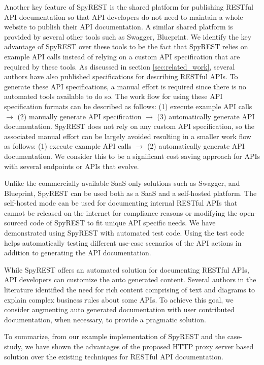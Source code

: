 \documentclass[conference]{IEEEtran}
\begin{document}
Another key feature of SpyREST is the shared platform for publishing RESTful API documentation so that API developers do not need to maintain a whole website to publish their API documentation. A similar shared platform is provided by several other tools such as Swagger, Blueprint. We identify the key advantage of SpyREST over these tools to be the fact that SpyREST relies on example API calls instead of relying on a custom API specification that are required by these tools. As discussed in section \ref{sec:related_work}, several authors have also published specifications for describing RESTful APIs. To generate these API specifications, a manual effort is required since there is no automated tools available to do so. The work flow for using these API specification formats can be described as follows: (1) execute example API calls $\longrightarrow$ (2) manually generate API specification $\longrightarrow$ (3) automatically generate API documentation. SpyREST does not rely on any custom API specification, so the associated manual effort can be largely avoided resulting in a smaller work flow as follows: (1) execute example API calls $\longrightarrow$ (2) automatically generate API documentation. We consider this to be a significant cost saving approach for APIs with several endpoints or APIs that evolve.

Unlike the commercially available SaaS only solutions such as Swagger, and Blueprint, SpyREST can be used both as a SaaS and a self-hosted platform. The self-hosted mode can be used for documenting internal RESTful APIs that cannot be released on the internet for compliance reasons or modifying the open-sourced code of SpyREST to fit unique API specific needs. We have demonstrated using SpyREST with automated test code. Using the test code helps automatically testing different use-case scenarios of the API actions in addition to generating the API documentation.

While SpyREST offers an automated solution for documenting RESTful APIs, API developers can customize the auto generated content. Several authors in the literature identified the need for rich content comprising of text and diagrams to explain complex business rules about some APIs. To achieve this goal, we consider augmenting auto generated documentation with user contributed documentation, when necessary, to provide a pragmatic solution.

To summarize, from our example implementation of SpyREST and the case-study, we have shown the advantages of the proposed HTTP proxy server based solution over the existing techniques for RESTful API documentation.
\end{document}
